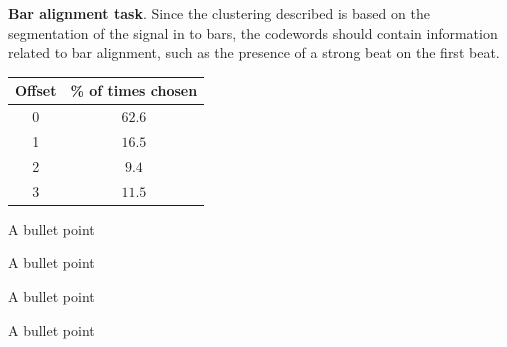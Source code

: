 \documentclass[landscape,a0b,final]{a0poster}
\newenvironment{poster}{
  \begin{center}
  \begin{minipage}[c]{0.98\textwidth}
}{
  \end{minipage} 
  \end{center}
}
\newcommand{\pbox}[4]{
\psshadowbox[#3]{
\begin{minipage}[t][#2][t]{#1}
#4
\end{minipage}
}}
\newcommand{\mytablecaption}[1]{
  \vspace{1.0cm}
  \begin{quote}
    {{\sc Table} \arabic{table}: #1}
  \end{quote}
  \vspace{1cm}
  \stepcounter{table}
}
\begin{document}
\begin{poster}
\begin{multicols}{3}
\begin{minipage}[c][9cm][c]{\columnwidth}
\end{minipage}

\vspace{2cm}

\begin{minipage}[c][9cm][c]{\columnwidth}
\textbf{Bar alignment task}.
Since the clustering described is based
on the segmentation of the signal in to bars, 
the codewords should contain information related to bar
alignment, such as the presence of a strong beat on the first beat.\\
\end{minipage}
\begin{minipage}[c][9cm][c]{0.21\textwidth}
  \begin{center}
      \begin{tabular}{cc}
        Offset & \% of times chosen \\ \hline \hline
        0 & $\mathbf{62.6}$\\
        1 & $16.5$\\
        2 & $9.4$\\
        3 & $11.5$
      \end{tabular}
      \label{tab:offset}
  \end{center}
\end{minipage}

\begin{list}{}{\leftmargin=2em =1em}
\item A bullet point
\item A bullet point
\item A bullet point
\item A bullet point
\end{list}


\vspace{0cm}
\begin{center}
  \pbox{0.8\columnwidth}{}{linewidth=2mm,framearc=0.1,linecolor=lightred,fillstyle=gradient,gradangle=0,gradbegin=white,gradend=whitepink,gradmidpoint=1.0,framesep=1em}{
    \begin{center}
      \large Conclusion
    \end{center}}
\end{center}


\end{multicols}
\end{poster}
\end{document}

